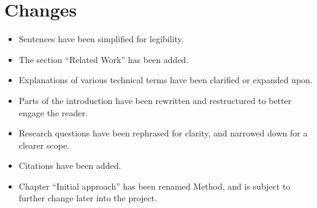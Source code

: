 \documentclass[msc,lith,english]{liuthesis}
\begin{document}
\appendix
\chapter{Changes}
\begin{itemize}
    \item Sentences have been simplified for legibility.
    \item The section ``Related Work'' has been added.
    \item Explanations of various technical terms have been clarified or expanded upon.
    \item Parts of the introduction have been rewritten and restructured to better engage the reader.
    \item Research questions have been rephrased for clarity, and narrowed down for a clearer scope.
    \item Citations have been added.
    \item Chapter ``Initial approach'' has been renamed Method, and is subject to further change later into the project.
\end{itemize}

\printbibliography
\end{document}
